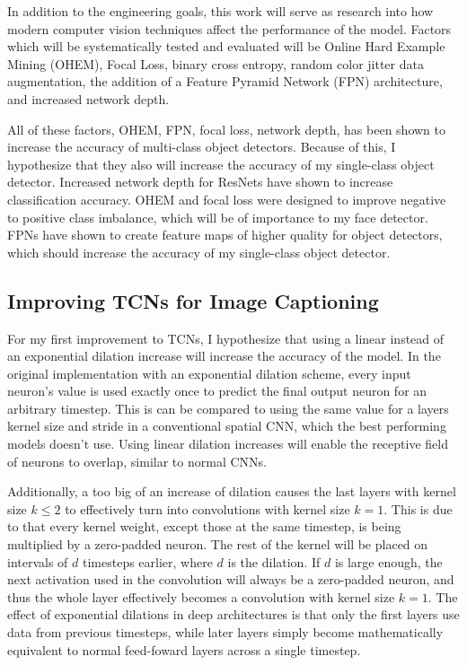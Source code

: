 \documentclass[a4paper, twoside]{article}
\begin{document}
In addition to the engineering goals, this work will serve as research into how modern computer vision techniques affect the performance of the model. Factors which will be systematically tested and evaluated will be Online Hard Example Mining (OHEM), Focal Loss, binary cross entropy, random color jitter data augmentation, the addition of a Feature Pyramid Network (FPN) architecture, and increased network depth.

All of these factors, OHEM, FPN, focal loss, network depth, has been shown to increase the accuracy of multi-class object detectors. Because of this, I hypothesize that they also will increase the accuracy of my single-class object detector. Increased network depth for ResNets have shown to increase classification accuracy. OHEM and focal loss were designed to improve negative to positive class imbalance, which will be of importance to my face detector. FPNs have shown to create feature maps of higher quality for object detectors, which should increase the accuracy of my single-class object detector.

\subsection{Improving TCNs for Image Captioning}
For my first improvement to TCNs, I hypothesize that using a linear instead of an exponential dilation increase will increase the accuracy of the model. In the original implementation with an exponential dilation scheme, every input neuron's value is used exactly once to predict the final output neuron for an arbitrary timestep. This is can be compared to using the same value for a layers kernel size and stride in a conventional spatial CNN, which the best performing models doesn't use. Using linear dilation increases will enable the receptive field of neurons to overlap, similar to normal CNNs. 

Additionally, a too big of an increase of dilation causes the last layers with kernel size $k \leq 2$ to effectively turn into convolutions with kernel size $k=1$. This is due to that every kernel weight, except those at the same timestep, is being multiplied by a zero-padded neuron. The rest of the kernel will be placed on intervals of $d$ timesteps earlier, where $d$ is the dilation. If $d$ is large enough, the next activation used in the convolution will always be a zero-padded neuron, and thus the whole layer effectively becomes a convolution with kernel size $k=1$. The effect of exponential dilations in deep architectures is that only the first layers use data from previous timesteps, while later layers simply become mathematically equivalent to normal feed-foward layers across a single timestep.
\end{document}
